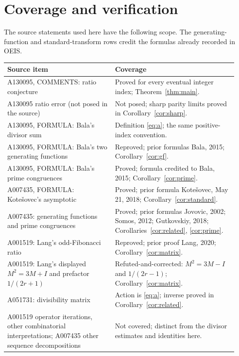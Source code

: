 \documentclass[11pt]{article}
\begin{document}
\section{Coverage and verification}
The source statements used here have the following scope. The
generating-function and standard-transform rows credit the formulas
already recorded in OEIS.
\begin{center}\small
\begin{tabular}{@{}p{0.44\linewidth}p{0.50\linewidth}@{}}
\toprule
Source item & Coverage \\
\midrule
A130095, COMMENTS: ratio conjecture &
Proved for every eventual integer index; Theorem~\ref{thm:main}. \\
A130095 ratio error (not posed in the source) &
Not posed; sharp parity limits proved in Corollary~\ref{cor:sharp}. \\
A130095, FORMULA: Bala's divisor sum &
Definition \eqref{eq:a}; the same positive-index convention. \\
A130095, FORMULA: Bala's two generating functions &
Reproved; prior formulas Bala, 2015; Corollary~\ref{cor:gf}. \\
A130095, FORMULA: Bala's prime congruences &
Proved; formula credited to Bala, 2015; Corollary~\ref{cor:prime}. \\
A007435, FORMULA: Kote\v{s}ovec's asymptotic &
Proved; prior formula Kote\v{s}ovec, May 21, 2018;
Corollary~\ref{cor:standard}. \\
A007435: generating functions and prime congruences &
Proved; prior formulas Jovovic, 2002; Somos, 2012;
Gutkovskiy, 2018; Corollaries~\ref{cor:related}, \ref{cor:prime}. \\
A001519: Lang's odd-Fibonacci ratio &
Reproved; prior proof Lang, 2020; Corollary~\ref{cor:matrix}. \\
A001519: Lang's displayed $M^2=3M+I$ and prefactor $1/(2r+1)$ &
Refuted-and-corrected: $M^2=3M-I$ and $1/(2r-1)$;
Corollary~\ref{cor:matrix}. \\
A051731: divisibility matrix \cite{divisibility} &
Action is \eqref{eq:a}; inverse proved in Corollary~\ref{cor:related}. \\
A001519 operator iterations, other combinatorial interpretations;
A007435 other sequence decompositions &
Not covered; distinct from the divisor estimates and identities here. \\
\bottomrule
\end{tabular}
\end{center}
\end{document}
